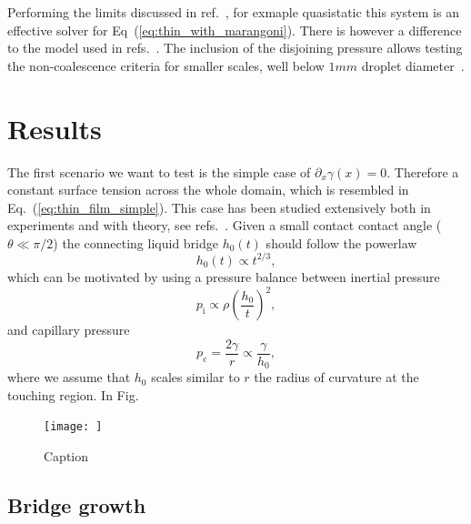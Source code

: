 \documentclass[twocolumn,amsmath,amssymb,showpacs,pre,nofootinbib,superscriptaddress]{revtex4-1} %
\begin{document}
Performing the limits discussed in ref.~\cite{PhysRevE.100.033313, PhysRevE.104.034801}, for exmaple quasistatic this system is an effective solver for Eq~(\ref{eq:thin_with_marangoni}).
There is however a difference to the model used in refs.~\cite{doi:10.1021/la500459v, karpitschka2014sharp}.
The inclusion of the disjoining pressure allows testing the non-coalescence criteria for smaller scales, well below $1mm$ droplet diameter~\cite{karpitschka2014sharp}.

\section{Results}\label{sec:results}

The first scenario we want to test is the simple case of $\partial_x\gamma(x) = 0$.
Therefore a constant surface tension across the whole domain, which is resembled in Eq.~(\ref{eq:thin_film_simple}).
This case has been studied extensively both in experiments and with theory, see refs.~\cite{eggers_lister_stone_1999, PhysRevLett.95.164503, PhysRevLett.111.144502, duchemin_eggers_josserand_2003}. 
Given a small contact contact angle ($\theta \ll \pi/2$) the connecting liquid bridge $h_0(t)$ should follow the powerlaw 
\begin{equation}\label{eq:bridge_power23}
    h_0(t) \propto t^{2/3},
\end{equation}
which can be motivated by using a pressure balance between inertial pressure
\begin{equation}\label{eq:p_inert}
    p_{\text{i}} \propto \rho\left(\frac{h_0}{t}\right)^2,
\end{equation}
and capillary pressure~\cite{doi:10.1021/la800630w}
\begin{equation}\label{eq:p_cap}
    p_{\text{c}} = \frac{2\gamma}{r} \propto \frac{\gamma}{h_0},
\end{equation}
where we assume that $h_0$ scales similar to $r$ the radius of curvature at the touching region.
In Fig.

\begin{figure}
    \centering
    \texttt{[image: ]}
    \caption{Caption}
    \label{fig:my_label}
\end{figure}

\subsection{Bridge growth}\label{subsec:growth}
\end{document}
